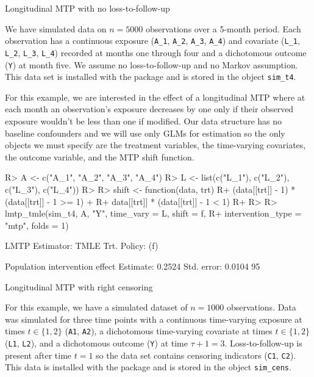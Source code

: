 \documentclass[twoside,11pt]{article}
\newenvironment{CodeChunk}{}{}
\let\code=\texttt
\begin{document}
\hypertarget{example-1-longitudinal-mtp-with-no-loss-to-follow-up}{
\begin{example}{Longitudinal MTP with no loss-to-follow-up}
\end{example}}

We have simulated data on \(n = 5000\) observations over a 5-month period. Each observation has a continuous exposure (\code{A\_1}, \code{A\_2}, \code{A\_3}, \code{A\_4}) and covariate (\code{L\_1}, \code{L\_2}, \code{L\_3}, \code{L\_4}) recorded at months one through four and a dichotomous outcome (\code{Y}) at month five. We assume no loss-to-follow-up and no Markov assumption. This data set is installed with the package and is stored in the object \code{sim\_t4}.

For this example, we are interested in the effect of a longitudinal MTP where at each month an observation's exposure decreases by one only if their observed exposure wouldn't be less than one if modified. Our data structure has no baseline confounders and we will use only GLMs for estimation so the only objects we must specify are the treatment variables, the time-varying covariates, the outcome variable, and the MTP shift function.

\begin{CodeChunk}
\begin{CodeInput}
R> A <- c("A_1", "A_2", "A_3", "A_4")
R> L <- list(c("L_1"), c("L_2"), c("L_3"), c("L_4"))
R> 
R> shift <- function(data, trt) {
R+   (data[[trt]] - 1) * (data[[trt]] - 1 >= 1) + 
R+     data[[trt]] * (data[[trt]] - 1 < 1)
R+ }
R> 
R> lmtp_tmle(sim_t4, A, "Y", time_vary = L, shift = f, 
R+           intervention_type = "mtp", folds = 1)
\end{CodeInput}

\begin{CodeOutput}
LMTP Estimator: TMLE
   Trt. Policy: (f)

Population intervention effect
      Estimate: 0.2524
    Std. error: 0.0104
        95%
\end{CodeOutput}
\end{CodeChunk}

\hypertarget{example-2-longitudinal-mtp-right-censoring}{
\begin{example}{Longitudinal MTP with right censoring}
\end{example}}

For this example, we have a simulated dataset of \(n = 1000\) observations. Data was simulated for three time points with a continuous time-varying exposure at times \(t \in \{1, 2\}\) (\code{A1}, \code{A2}), a dichotomous time-varying covariate at times \(t \in \{1, 2\}\) (\code{L1}, \code{L2}), and a dichotomous outcome (\code{Y}) at time \(\tau + 1 = 3\). Loss-to-follow-up is present after time \(t = 1\) so the data set contains censoring indicators (\code{C1}, \code{C2}). This data is installed with the package and is stored in the object \code{sim\_cens}.
\end{document}
